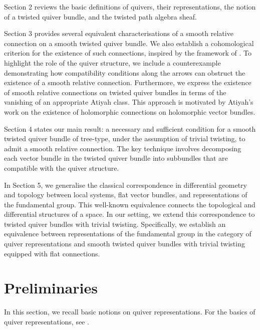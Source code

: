 \documentclass[12pt, reqno]{amsart}
\theoremstyle{plain}
\numberwithin{equation}{section}
\begin{document}
Section 2 reviews the basic definitions of quivers, their representations, the notion of a twisted quiver bundle, and the twisted path algebra sheaf.


Section 3 provides several equivalent characterisations of a smooth relative connection on a smooth twisted quiver bundle. We also establish a cohomological criterion for the existence of such connections, inspired by the framework of \cite[Theorem 4.1]{GK}. To highlight the role of the quiver structure, we include a counterexample demonstrating how compatibility conditions along the arrows can obstruct the existence of a smooth relative connection. Furthermore, we express the existence of smooth relative connections on twisted quiver bundles in terms of the vanishing of an appropriate Atiyah class. This approach is motivated by Atiyah's work \cite{At} on the existence of holomorphic connections on holomorphic vector bundles.

Section 4 states our main result: a necessary and sufficient condition for a smooth twisted quiver bundle of tree-type, under the assumption of trivial twisting, to admit a smooth relative connection. The key technique involves decomposing each vector bundle in the twisted quiver bundle into subbundles that are compatible with the quiver structure.

In Section 5, we generalise the classical correspondence in differential geometry and topology between local systems, flat vector bundles, and representations of the fundamental group. This well-known equivalence connects the topological and differential structures of a space. In our setting, we extend this correspondence to twisted quiver bundles with trivial twisting. Specifically, we establish an equivalence between representations of the fundamental group in the category of quiver representations and smooth twisted quiver bundles with trivial twisting equipped with flat connections.




\section{Preliminaries}
In this section, we recall basic notions on quiver representations. For the basics of quiver representations, see \cite[Chapter~1]{DW}.
\end{document}
